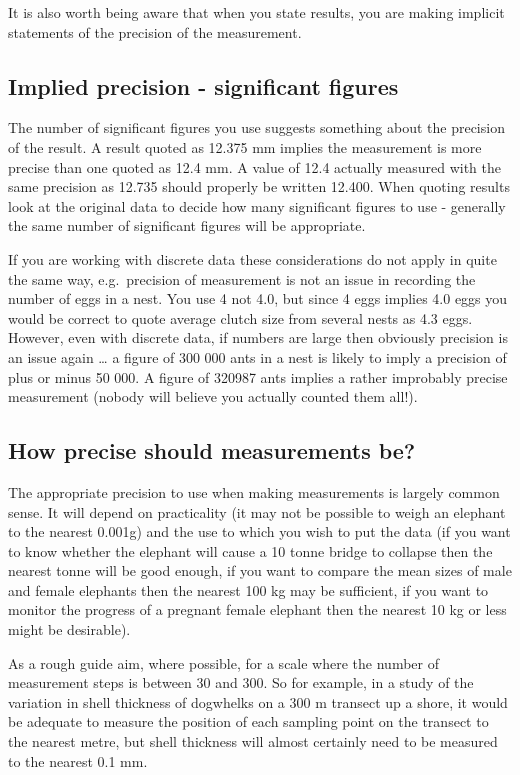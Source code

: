 \documentclass[]{book}
\begin{document}
It is also worth being aware that when you state results, you are making
implicit statements of the precision of the measurement.

\subsection{Implied precision - significant
figures}\label{implied-precision---significant-figures}

The number of significant figures you use suggests something about the
precision of the result. A result quoted as 12.375 mm implies the
measurement is more precise than one quoted as 12.4 mm. A value of 12.4
actually measured with the same precision as 12.735 should properly be
written 12.400. When quoting results look at the original data to decide
how many significant figures to use - generally the same number of
significant figures will be appropriate.

If you are working with discrete data these considerations do not apply
in quite the same way, e.g.~precision of measurement is not an issue in
recording the number of eggs in a nest. You use 4 not 4.0, but since 4
eggs implies 4.0 eggs you would be correct to quote average clutch size
from several nests as 4.3 eggs. However, even with discrete data, if
numbers are large then obviously precision is an issue again \ldots{} a
figure of 300 000 ants in a nest is likely to imply a precision of plus
or minus 50 000. A figure of 320987 ants implies a rather improbably
precise measurement (nobody will believe you actually counted them
all!).

\subsection{How precise should measurements
be?}\label{how-precise-should-measurements-be}

The appropriate precision to use when making measurements is largely
common sense. It will depend on practicality (it may not be possible to
weigh an elephant to the nearest 0.001g) and the use to which you wish
to put the data (if you want to know whether the elephant will cause a
10 tonne bridge to collapse then the nearest tonne will be good enough,
if you want to compare the mean sizes of male and female elephants then
the nearest 100 kg may be sufficient, if you want to monitor the
progress of a pregnant female elephant then the nearest 10 kg or less
might be desirable).

As a rough guide aim, where possible, for a scale where the number of
measurement steps is between 30 and 300. So for example, in a study of
the variation in shell thickness of dogwhelks on a 300 m transect up a
shore, it would be adequate to measure the position of each sampling
point on the transect to the nearest metre, but shell thickness will
almost certainly need to be measured to the nearest 0.1 mm.
\end{document}

